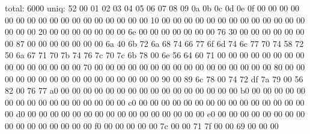 {\footnotesize
\begin{semiverbatim}
total: 6000
uniq:  52
\color{HexyGreen}\color{HexyGreen}   00 01 02 03 04 05 06 07 08 09 0a 0b 0c 0d 0e 0f
\color{HexyGreen}00 \color{Hexy0}00 00 00 00 00 00 00 00 00 00 00 00 00 00 00 00
\color{HexyGreen}10 \color{Hexy0}00 00 00 00 00 00 00 00 00 00 00 00 00 00 00 00
\color{HexyGreen}20 \color{Hexy0}00 00 00 00 00 00 00 \color{Hexy110}6e \color{Hexy0}00 00 00 00 00 00 00 \color{Hexy118}76
\color{HexyGreen}30 \color{Hexy0}00 00 00 00 00 00 00 \color{Hexy135}87 \color{Hexy0}00 00 00 00 00 00 00 \color{Hexy106}6a
\color{HexyGreen}40 \color{Hexy107}6b \color{Hexy114}72 \color{Hexy106}6a \color{Hexy104}68 \color{Hexy116}74 \color{Hexy102}66 \color{Hexy119}77 \color{Hexy111}6f \color{Hexy109}6d \color{Hexy116}74 \color{Hexy108}6c \color{Hexy119}77 \color{Hexy112}70 \color{Hexy116}74 \color{Hexy88}58 \color{Hexy114}72
\color{HexyGreen}50 \color{Hexy106}6a \color{Hexy103}67 \color{Hexy113}71 \color{Hexy112}70 \color{Hexy123}7b \color{Hexy116}74 \color{Hexy118}76 \color{Hexy124}7c \color{Hexy112}70 \color{Hexy124}7c \color{Hexy107}6b \color{Hexy120}78 \color{Hexy0}00 \color{Hexy110}6e \color{Hexy86}56 \color{Hexy100}64
\color{HexyGreen}60 \color{Hexy113}71 \color{Hexy0}00 00 00 00 00 00 00 00 00 00 00 00 00 00 00
\color{HexyGreen}70 \color{Hexy0}00 00 00 00 00 00 00 00 00 00 00 00 00 00 00 00
\color{HexyGreen}80 \color{Hexy0}00 00 00 00 00 00 00 00 00 00 00 00 00 00 00 00
\color{HexyGreen}90 \color{Hexy0}00 \color{Hexy137}89 \color{Hexy108}6c \color{Hexy120}78 \color{Hexy0}00 \color{Hexy116}74 \color{Hexy114}72 \color{Hexy223}df \color{Hexy122}7a \color{Hexy121}79 \color{Hexy0}00 \color{Hexy86}56 \color{Hexy130}82 \color{Hexy0}00 \color{Hexy118}76 \color{Hexy119}77
\color{HexyGreen}a0 \color{Hexy0}00 00 00 00 00 00 00 00 00 00 00 00 00 00 00 00
\color{HexyGreen}b0 \color{Hexy0}00 00 00 00 00 00 00 00 00 00 00 00 00 00 00 00
\color{HexyGreen}c0 \color{Hexy0}00 00 00 00 00 00 00 00 00 00 00 00 00 00 00 00
\color{HexyGreen}d0 \color{Hexy0}00 00 00 00 00 00 00 00 00 00 00 00 00 00 00 00
\color{HexyGreen}e0 \color{Hexy0}00 00 00 00 00 00 00 00 00 00 00 00 00 00 00 00
\color{HexyGreen}f0 \color{Hexy0}00 00 00 00 00 \color{Hexy124}7c \color{Hexy0}00 00 \color{Hexy113}71 \color{Hexy127}7f \color{Hexy0}00 00 \color{Hexy105}69 \color{Hexy0}00 00 00
\end{semiverbatim}
}
